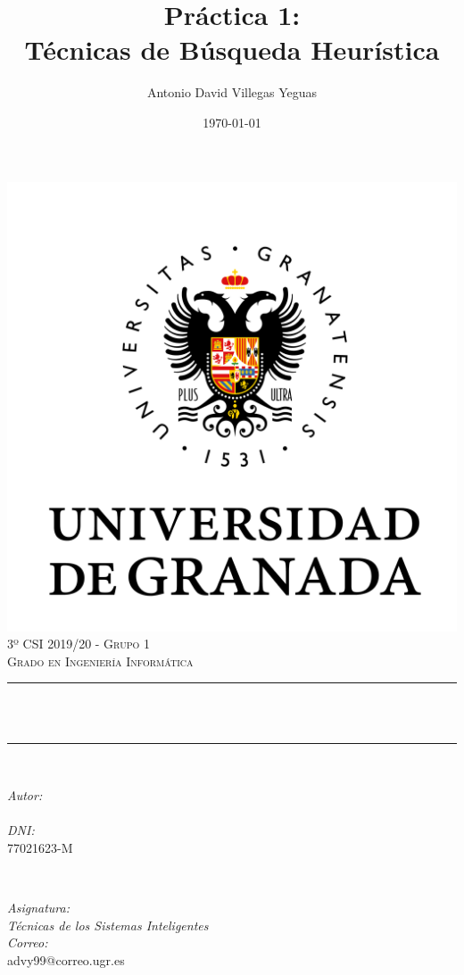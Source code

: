 \documentclass[10pt, spanish]{article}
\title{Práctica 1:\\
Técnicas de Búsqueda Heurística  \hspace{0.05cm} }
\author{Antonio David Villegas Yeguas}
\date{\today}
\makeatletter
\let\thetitle\@title
\let\theauthor\@author
\makeatother
\begin{document}

\begin{titlepage}
    \centering
    \vspace*{0.3 cm}
    \includegraphics[scale = 0.50]{ugr.png}\\[0.7 cm]
    \textsc{\large 3º CSI 2019/20 - Grupo 1}\\[0.5 cm]            
    \textsc{\large Grado en Ingeniería Informática}\\[0.5 cm]              
    \rule{\linewidth}{0.2 mm} \\[0.2 cm]
    { \huge \bfseries \thetitle}\\
    \rule{\linewidth}{0.2 mm} \\[1 cm]
    
    \begin{minipage}{0.4\textwidth}
        \begin{flushleft} \large
            \emph{Autor:}\\
            \theauthor\\ 
			 \emph{DNI:}\\
            77021623-M
            \end{flushleft}
            \end{minipage}~
            \begin{minipage}{0.4\textwidth}
            \begin{flushright} \large
            \emph{Asignatura: \\
            Técnicas de los Sistemas Inteligentes}   \\     
            \emph{Correo:}\\
            advy99@correo.ugr.es           
        \end{flushright}
    \end{minipage}\\[0.5cm]
  

\end{titlepage}
\end{document}
